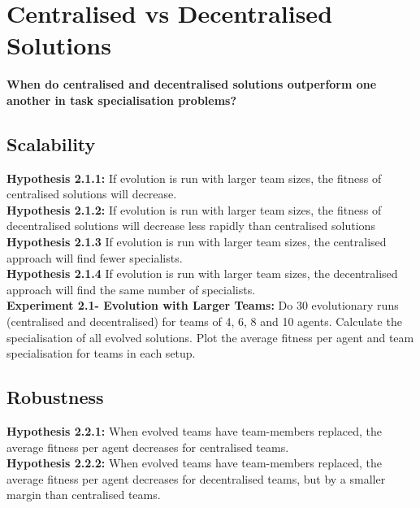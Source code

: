 \documentclass[12pt]{article}
\begin{document}
\section{Centralised vs Decentralised Solutions}

\textbf{When do centralised and decentralised solutions outperform one another in task specialisation problems?}\\

\subsection{Scalability}

\textbf{Hypothesis 2.1.1:} If evolution is run with larger team sizes, the fitness of centralised solutions will decrease.\\

\textbf{Hypothesis 2.1.2:} If evolution is run with larger team sizes, the fitness of decentralised solutions will decrease less rapidly than centralised solutions\\

\textbf{Hypothesis 2.1.3} If evolution is run with larger team sizes, the centralised approach will find fewer specialists.\\

\textbf{Hypothesis 2.1.4} If evolution is run with larger team sizes, the decentralised approach will find the same number of specialists.\\

\textbf{Experiment 2.1- Evolution with Larger Teams:} Do 30 evolutionary runs (centralised and decentralised) for teams of 4, 6, 8 and 10 agents.
Calculate the specialisation of all evolved solutions.
Plot the average fitness per agent and team specialisation for teams in each setup. \\

\subsection{Robustness}

\textbf{Hypothesis 2.2.1:} When evolved teams have team-members replaced, the average fitness per agent decreases for centralised teams.\\

\textbf{Hypothesis 2.2.2:} When evolved teams have team-members replaced, the average fitness per agent decreases for decentralised teams, but by a smaller margin than centralised teams.\\
\end{document}
